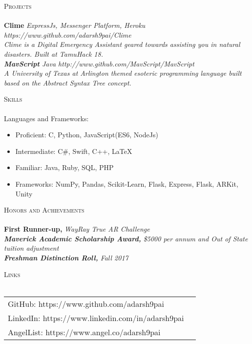 \documentclass[a4paper]{article}
\newcommand{\lineunder} {
    \vspace*{-8pt} \\
    \hspace*{-18pt} \hrulefill \\
}
\newcommand{\header} [1] {
    {\hspace*{-18pt}\vspace*{6pt} \textsc{#1}}
    \vspace*{-6pt} \lineunder
}
\begin{document}
\header{Projects}
{\textbf{Clime}} \sl {ExpressJs, Messenger Platform, Heroku} \hfill https://www.github.com/adarsh9pai/Clime\\
Clime is a Digital Emergency Assistant geared towards assisting you in natural disasters. Built at TamuHack \textquotesingle{}18.\\
\vspace*{2mm}
{\textbf{MavScript}} \sl {Java} \hfill http://www.github.com/MavScript/MavScript\\
A University of Texas at Arlington themed esoteric programming language built based on the Abstract Syntax Tree concept.\\
\vspace*{2mm}

\header{Skills}
Languages and Frameworks:
\begin{itemize}
\item Proficient: C, Python, JavaScript(ES6, NodeJs)
\item Intermediate: C\#, Swift, C++, \LaTeX
\item Familiar: Java, Ruby, SQL, PHP
\item Frameworks: NumPy, Pandas, Scikit-Learn, Flask, Express, Flask, ARKit, Unity
\end{itemize}

\vspace{2mm}


\header{Honors and Achievements}
{\textbf{First Runner-up,}} \sl{WayRay True AR Challenge} \hfill \\
{\textbf{Maverick Academic Scholarship Award,}} \sl{\$5000 per annum and Out of State tuition adjustment} \hfill \\
{\textbf{Freshman Distinction Roll,}} \sl{Fall 2017} \hfill \\
\vspace*{2mm}

\header{Links}
\vspace{2mm} 
\begin{tabular}{ l l }
    GitHub: https://www.github.com/adarsh9pai   \\
    LinkedIn: https://www.linkedin.com/in/adarsh9pai   \\
    AngelList: https://www.angel.co/adarsh9pai   \\
  
    
	
\end{tabular}
\vspace{2mm}

\ 
\end{document}
